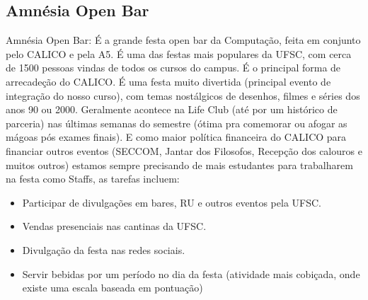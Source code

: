 \subsection{Amnésia Open Bar} 
Amnésia Open Bar: É a grande festa open bar da Computação, feita em conjunto pelo CALICO e pela A5. É uma das festas mais populares da UFSC, com cerca de 1500 pessoas vindas de todos os cursos do campus. É o principal forma de arrecadeção do CALICO. É uma festa muito divertida (principal evento de integração do nosso curso), com temas nostálgicos de desenhos, filmes e séries dos anos 90 ou 2000. Geralmente acontece na Life Club (até por um histórico de parceria) nas últimas semanas do semestre (ótima pra comemorar ou afogar as mágoas pós exames finais). E como maior política financeira do CALICO para financiar outros eventos (SECCOM, Jantar dos Filosofos, Recepção dos calouros e muitos outros) estamos sempre precisando de mais estudantes para trabalharem na festa como Staffs, as tarefas incluem:
\begin{itemize}
    \item Participar de divulgações em bares, RU e outros eventos pela UFSC.
    \item Vendas presenciais nas cantinas da UFSC.
    \item Divulgação da festa nas redes sociais.
    \item Servir bebidas por um período no dia da festa (atividade mais cobiçada, onde existe uma escala baseada em pontuação)
\end{itemize}
